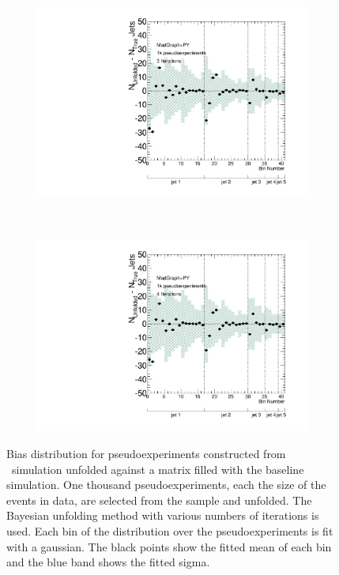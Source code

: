 \begin{figure}
\begin{subfigure}[]{0.5\textwidth}
\includegraphics[width=\textwidth]{fig/Stress/110872atlfast/Bias3Iterations.pdf}
\end{subfigure}
~
\begin{subfigure}[]{0.5\textwidth}
\includegraphics[width=\textwidth]{fig/Stress/110872atlfast/Bias4Iterations.pdf}
\end{subfigure}
\caption{Bias distribution for pseudoexperiments constructed from \newline \madpy\ simulation unfolded against a matrix filled with the baseline simulation. One thousand pseudoexperiments, each the size of the events in data, are selected from the sample and unfolded. The Bayesian unfolding method with various numbers of iterations is used. Each bin of the distribution over the pseudoexperiments is fit with a gaussian. The black points show the fitted mean of each bin and the blue band shows the fitted sigma.}
\label{fig:p8bias}
\end{figure}
